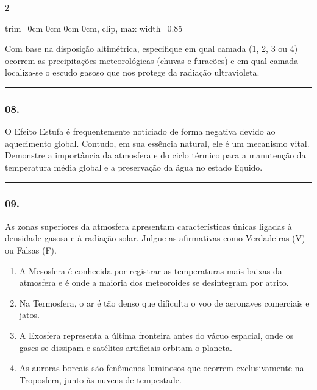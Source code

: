 \documentclass[twoside, 10pt, a4paper]{article}
\newlength{\espacoPreQuestao}
\newlength{\espacoQuestao}
\newlength{\espacoAlt}
\newcommand{\larguraTikz}{0.85\linewidth}
\begin{document}
\begin{multicols*}{2}
\begin{center}
\begin{adjustbox}{trim=0cm 0cm 0cm 0cm, clip, max width=\larguraTikz}
\end{adjustbox}
\end{center}

Com base na disposição altimétrica, especifique em qual camada (1, 2, 3 ou 4) ocorrem as precipitações meteorológicas (chuvas e furacões) e em qual camada localiza-se o escudo gasoso que nos protege da radiação ultravioleta.
\par\vspace{\espacoQuestao}

\noindent\textcolor{CorLinha}{\rule{\linewidth}{0.5pt}} 
\par\vspace{\espacoPreQuestao}
\subsubsection*{08.} O Efeito Estufa é frequentemente noticiado de forma negativa devido ao aquecimento global. Contudo, em sua essência natural, ele é um mecanismo vital. Demonstre a importância da atmosfera e do ciclo térmico para a manutenção da temperatura média global e a preservação da água no estado líquido.
\par\vspace{\espacoQuestao}

\noindent\textcolor{CorLinha}{\rule{\linewidth}{0.5pt}} 
\par\vspace{\espacoPreQuestao}
\subsubsection*{09.} As zonas superiores da atmosfera apresentam características únicas ligadas à densidade gasosa e à radiação solar. Julgue as afirmativas como Verdadeiras (V) ou Falsas (F).

\begin{enumerate}[label=(\ \ ), itemsep=\espacoAlt]
\item A Mesosfera é conhecida por registrar as temperaturas mais baixas da atmosfera e é onde a maioria dos meteoroides se desintegram por atrito.
\item Na Termosfera, o ar é tão denso que dificulta o voo de aeronaves comerciais e jatos.
\item A Exosfera representa a última fronteira antes do vácuo espacial, onde os gases se dissipam e satélites artificiais orbitam o planeta.
\item As auroras boreais são fenômenos luminosos que ocorrem exclusivamente na Troposfera, junto às nuvens de tempestade.
\end{enumerate}
\par\vspace{\espacoQuestao}


\end{multicols*}
\end{document}

